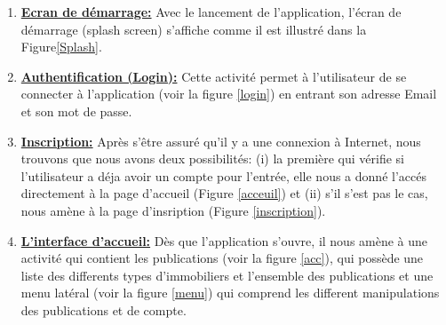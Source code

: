 \documentclass[french,a4,12pt]{report}
\begin{document}
\newpage
\begin{enumerate}[label=\textcolor{blue}{$\rhd$}]
	\item \underline{ \textbf{Ecran de démarrage:}}
Avec le lancement de l'application, l'écran de démarrage (splash screen) s'affiche comme il est illustré dans la Figure\ref{Splash}.


	\item \underline{\textbf{Authentification (Login):}}
	Cette activité permet à l'utilisateur de se connecter à l'application (voir la figure \ref{login}) en entrant son adresse Email et son mot de passe.
	
	\newpage
		\item \underline{\textbf{Inscription:}}
		  Après s'être assuré qu'il y a une connexion à Internet, nous trouvons que nous avons deux possibilités: (i) la première qui vérifie si l'utilisateur a déja avoir un compte  pour l'entrée, elle nous a donné l'accés directement à la page d'accueil (Figure \ref{acceuil}) et (ii) s'il s'est pas le cas, nous amène à la page d'insription (Figure \ref{inscription}).
	\item \underline{\textbf{L'interface d'accueil:}}
	Dès que l'application s'ouvre, il nous amène à une activité qui contient les publications (voir la figure \ref{acc}), qui possède une liste des differents types d'immobiliers et l'ensemble des publications et une menu latéral (voir la figure \ref{menu}) qui comprend les different manipulations des publications et de compte. 
	~
	\end{enumerate}
\end{document}
